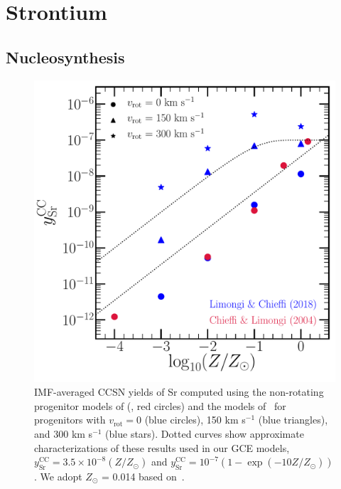 
\section{Strontium}
\label{bursts:sec:sr}
\subsection{Nucleosynthesis}
\label{bursts:sec:sr_nuc}

\begin{figure} %
\centering
\includegraphics[scale = 0.45]{sr_cc_yields.pdf}
\caption{
IMF-averaged CCSN yields of Sr computed using the non-rotating progenitor 
models of (\citealp{Chieffi2004}, red circles) and the models 
of~\citet{Limongi2018} for progenitors with $v_\text{rot} = 0$ (blue circles), 
150 km s$^{-1}$ (blue triangles), and 300 km s$^{-1}$ (blue stars). Dotted 
curves show approximate characterizations of these results used in our GCE 
models, $y_\text{Sr}^\text{CC} = 3.5\times10^{-8}(Z/Z_\odot)$ and 
$y_\text{Sr}^\text{CC} = 10^{-7}(1 - \exp{(-10Z/Z_\odot)})$. We adopt $Z_\odot$ = 
0.014 based on~\citet{Asplund2009}. 
}
\label{bursts:fig:sr_cc_yields}
\end{figure} 

